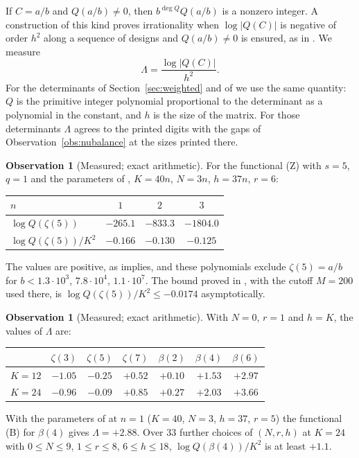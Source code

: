 \documentclass[11pt]{article}
\theoremstyle{definition}
\newtheorem{observation}[theorem]{Observation}
\begin{document}
If $C=a/b$ and $Q(a/b)\ne0$, then $b^{\deg Q}Q(a/b)$ is a nonzero integer. A construction of this kind proves irrationality when $\log|Q(C)|$ is negative of order $h^2$ along a sequence of designs and $Q(a/b)\ne0$ is ensured, as in \cite{Fauzan}. We measure
\[
\Lambda=\frac{\log|Q(C)|}{h^2}.
\]
For the determinants of Section~\ref{sec:weighted} and of \cite{OAI} we use the same quantity: $Q$ is the primitive integer polynomial proportional to the determinant as a polynomial in the constant, and $h$ is the size of the matrix. For those determinants $\Lambda$ agrees to the printed digits with the gaps of Observation~\ref{obs:nubalance} at the sizes printed there.

\begin{observation}[Measured; exact arithmetic]\label{obs:fzcontrol}
For the functional (Z) with $s=5$, $q=1$ and the parameters of \cite{Fauzan}, $K=40n$, $N=3n$, $h=37n$, $r=6$:
\begin{center}
\small
\begin{tabular}{lccc}
\toprule
$n$ & $1$ & $2$ & $3$\\
\midrule
$\log Q(\zeta(5))$ & $-265.1$ & $-833.3$ & $-1804.0$\\
$\log Q(\zeta(5))/K^2$ & $-0.166$ & $-0.130$ & $-0.125$\\
\bottomrule
\end{tabular}
\end{center}
The values are positive, as \cite[Proposition~2.2]{Fauzan} implies, and these polynomials exclude $\zeta(5)=a/b$ for $b<1.3\cdot10^3$, $7.8\cdot10^4$, $1.1\cdot10^7$. The bound proved in \cite[(7.1), (7.2)]{Fauzan}, with the cutoff $M=200$ used there, is $\log Q(\zeta(5))/K^2\le-0.0174$ asymptotically.
\end{observation}

\begin{observation}[Measured; exact arithmetic]\label{obs:fzweights}
With $N=0$, $r=1$ and $h=K$, the values of $\Lambda$ are:
\begin{center}
\small
\begin{tabular}{lcccccc}
\toprule
& $\zeta(3)$ & $\zeta(5)$ & $\zeta(7)$ & $\beta(2)$ & $\beta(4)$ & $\beta(6)$\\
\midrule
$K=12$ & $-1.05$ & $-0.25$ & $+0.52$ & $+0.10$ & $+1.53$ & $+2.97$\\
$K=24$ & $-0.96$ & $-0.09$ & $+0.85$ & $+0.27$ & $+2.03$ & $+3.66$\\
\bottomrule
\end{tabular}
\end{center}
With the parameters of \cite{Fauzan} at $n=1$ ($K=40$, $N=3$, $h=37$, $r=5$) the functional (B) for $\beta(4)$ gives $\Lambda=+2.88$. Over $33$ further choices of $(N,r,h)$ at $K=24$ with $0\le N\le9$, $1\le r\le8$, $6\le h\le18$, $\log Q(\beta(4))/K^2$ is at least $+1.1$.
\end{observation}
\end{document}
